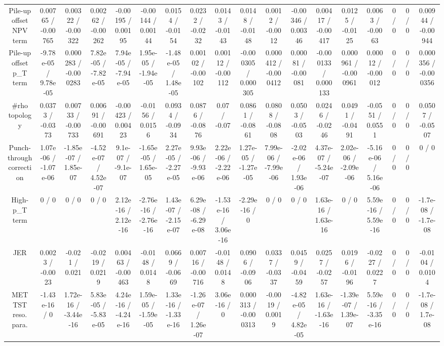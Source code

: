 \documentclass[10pt]{article}
\begin{document}
\begin{table}[htbp]
\begin{center}
\begin{tabular}{|c|c|c|c|c|c|c|c|c|c|c|c|c|c|c|c|c|c|}
  Pile-up offset NPV term & 0.00765 / -0.00765 & 0.00322 / -0.00322 & 0.00262 / -0.00262 & -0.00195 / 0.00195 & -0.00144 / 0.00144 & 0.0154 / -0.0154 & 0.0232 / -0.0232 & 0.0143 / -0.0143 & 0.0148 / -0.0148 & 0.0012 / -0.0012 & -0.00346 / 0.00346 & 0.00417 / -0.00417 & 0.0125 / -0.0125 & 0.0063 / -0.0063 & 0 / 0 & 0 / 0 & 0.00944 / -0.00944 \\ 
  Pile-up offset p_{T} term & -9.78e-05 / 9.78e-05 & 0.000283 / -0.000283 & 7.82e-05 / -7.82e-05 & 7.94e-05 / -7.94e-05 & 1.95e-05 / -1.94e-05 & -1.48e-05 / 1.48e-05 & 0.00102 / -0.00102 & 0.00112 / -0.00112 & -0.000305 / 0.000305 & 0.000412 / -0.000412 & 0.00081 / -0.00081 & -0.000133 / 0.000133 & 0.000961 / -0.000961 & 0.00012 / -0.00012 & 0 / 0 & 0 / 0 & 0.000356 / -0.000356 \\ 
  #rho topology & 0.0373 / -0.0373 & 0.00733 / -0.00733 & 0.00691 / -0.00691 & -0.00423 / 0.00423 & -0.0156 / 0.0156 & 0.0934 / -0.0934 & 0.0876 / -0.0876 & 0.07 / -0.07 & 0.0861 / -0.0861 & 0.0808 / -0.0808 & 0.0503 / -0.0503 & 0.0246 / -0.0246 & 0.0491 / -0.0491 & -0.0551 / 0.0551 & 0 / 0 & 0 / 0 & 0.0507 / -0.0507 \\ 
  Punch-through correction & 1.07e-06 / -1.07e-06 & -1.85e-07 / 1.85e-07 & -4.52e-07 / 4.52e-07 & 9.1e-07 / -9.1e-07 & -1.65e-05 / 1.65e-05 & 2.27e-05 / -2.27e-05 & 9.93e-06 / -9.93e-06 & 2.22e-06 / -2.22e-06 & 1.27e-05 / -1.27e-05 & 7.99e-06 / -7.99e-06 & -2.02e-06 / 1.93e-06 & 4.37e-07 / -5.24e-07 & 2.02e-06 / -2.09e-06 & -5.16e-06 / 5.16e-06 & 0 / 0 & 0 / 0 & 0 / 0 \\ 
  High-p_{T} term & 0 / 0 & 0 / 0 & 0 / 0 & 2.12e-16 / 2.12e-16 & -2.76e-16 / -2.76e-16 & 1.43e-07 / -2.15e-07 & 6.29e-08 / -6.29e-08 & -1.53e-16 / 3.06e-16 & -2.29e-16 / 0 & 0 / 0 & 0 / 0 & 1.63e-16 / 1.63e-16 & 0 / 0 & 5.59e-16 / 5.59e-16 & 0 / 0 & 0 / 0 & -1.7e-08 / -1.7e-08 \\ 
  JER & 0.0023 / -0.0023 & -0.021 / 0.021 & -0.0219 / 0.0219 & 0.00463 / -0.00463 & -0.0148 / 0.0148 & 0.0669 / -0.0669 & 0.00716 / -0.00716 & -0.0148 / 0.0148 & 0.0906 / -0.0906 & 0.0337 / -0.0337 & 0.0459 / -0.0459 & 0.0257 / -0.0257 & 0.0196 / -0.0196 & -0.0227 / 0.0227 & 0 / 0 & 0 / 0 & -0.0104 / 0.0104 \\ 
  MET TST reso. para. & -1.43e-16 / 0 & 1.72e-16 / -3.44e-16 & 5.83e-05 / -5.83e-05 & 4.24e-16 / -4.24e-16 & 1.59e-05 / -1.59e-05 & 1.33e-16 / -1.33e-16 & -1.26e-07 / 1.26e-07 & 3.06e-16 / 0 & 0.000313 / -0.000313 & -0.0019 / 0.0019 & -4.82e-05 / 4.82e-05 & 1.63e-16 / -1.63e-16 & -1.39e-07 / 1.39e-07 & 5.59e-16 / -3.35e-16 & 0 / 0 & 0 / 0 & -1.7e-08 / 1.7e-08 \\ 

\end{tabular}
\end{center}
\end{table}
\end{document}
